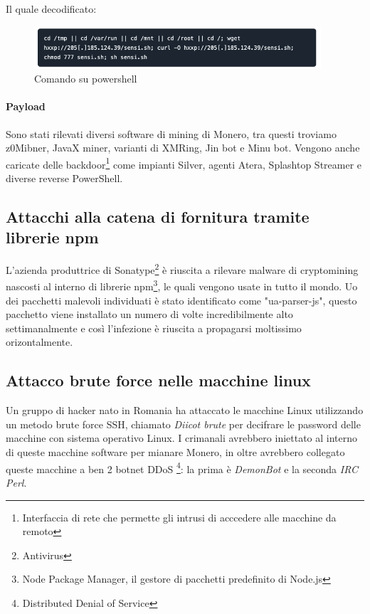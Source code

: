 \documentclass[12pt,a4paper]{article}
\begin{document}
Il quale decodificato:

\begin{figure}[ht]
    \centering
    \includegraphics[width=0.95\textwidth]{./images/powershell3.png}
    \caption{Comando su powershell}
    \label{fig:powershell_command3}
\end{figure}

\paragraph{Payload} Sono stati rilevati diversi software di mining di Monero,
tra questi troviamo z0Mibner, JavaX miner, varianti di XMRing, Jin bot e Minu
bot. Vengono anche caricate delle backdoor\footnote{Interfaccia di rete che
permette gli intrusi di acccedere alle macchine da remoto} come impianti Silver,
agenti Atera, Splashtop Streamer e diverse reverse PowerShell.

\subsection{Attacchi alla catena di fornitura tramite librerie npm}
L'azienda produttrice di Sonatype\footnote{Antivirus} è riuscita a rilevare
malware di cryptomining nascosti al interno di librerie npm\footnote{Node
Package Manager, il gestore di pacchetti predefinito di Node.js}, le quali
vengono usate in tutto il mondo. Uo dei pacchetti malevoli individuati è stato
identificato come "ua-parser-js", questo pacchetto viene installato un numero di
volte incredibilmente alto settimanalmente e così l'infezione è riuscita a
propagarsi moltissimo orizontalmente.

\subsection{Attacco brute force nelle macchine linux}
Un gruppo di hacker nato in Romania ha attaccato le macchine Linux utilizzando
un metodo brute force SSH, chiamato \textit{Diicot brute} per decifrare le
password delle macchine con sistema operativo Linux. I crimanali avrebbero
iniettato al interno di queste macchine software per mianare Monero, in oltre
avrebbero collegato queste macchine a ben 2 botnet DDoS \footnote{Distributed
Denial of Service}: la prima è \textit{DemonBot} e la seconda \textit{IRC Perl}.
\end{document}

